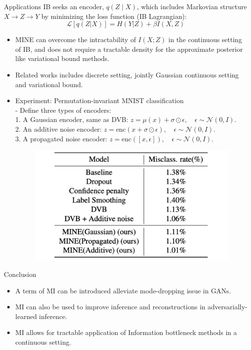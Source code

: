 \documentclass[final]{beamer}
\newlength{\colwidth}
\begin{document}
\begin{frame}[t]
\begin{columns}[t]
\begin{column}{\colwidth}
\begin{block}{Applications}
IB seeks an encoder, $q(Z \mid X)$, which includes Markovian structure $X \to Z \to Y$ by minimizing the loss function (IB Lagrangian): 
\begin{equation}
    \mathcal L[q(Z | X)] = H(Y | Z) + \beta I(X, Z)
\end{equation}
\begin{itemize}
    \item MINE can overcome the intractability of $I(X; Z)$ in the continuous setting of IB, and does not require a tractable density for the approximate posterior like variational bound methods.
    \item Related works includes discrete setting, jointly Gaussian continuous setting and variational bound.
    \item Experiment: Permutation-invariant MNIST classification\\
    - Define three types of encoders:\\
    1. A Gaussian encoder, same as DVB: $z = \mu(x) + \sigma \odot \epsilon, \quad \epsilon \sim \mathcal{N}(0, I)$.\\
    2. An additive noise encoder: $z = \text{enc}(x + \sigma \odot \epsilon), \quad \epsilon \sim \mathcal{N}(0, I)$.\\
    3. A propagated noise encoder: $z = \text{enc}([x, \epsilon]), \quad \epsilon \sim \mathcal{N}(0, I)$.\\
    \begin{figure}
        \centering
        \includegraphics[width=0.75\linewidth]{figures/截屏2024-12-31 11.34.28.png}
    \end{figure}
    
\end{itemize}

\end{block}

\begin{block}{Conclusion}

    \begin{itemize}
      \item A term of MI can be introduced alleviate mode-dropping issue in GANs. 
      \item MI can also be used to improve inference and reconstructions in adversarially-learned inference. 
      \item MI allows for tractable application of Information bottleneck methods in a continuous setting.
    \end{itemize}


\end{block}
\end{column}
\end{columns}
\end{frame}
\end{document}
